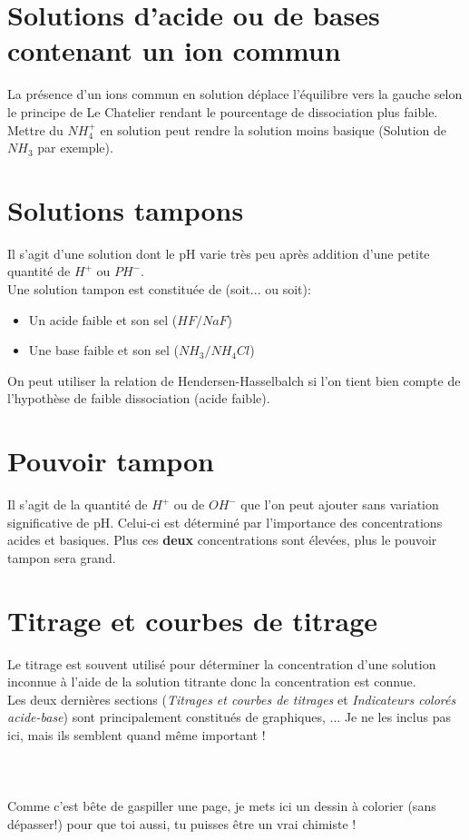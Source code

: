 \documentclass	[11pt, a4paper, openany]{book}
\begin{document}
\section{Solutions d'acide ou de bases contenant un ion commun}
La présence d'un ions commun en solution déplace l'équilibre vers la gauche selon le principe de Le Chatelier rendant le pourcentage de dissociation plus faible. \\
Mettre du $NH_4^+$ en solution peut rendre la solution moins basique (Solution de $NH_3$ par exemple).

\section{Solutions tampons}
Il s'agit d'une solution dont le pH varie très peu après addition d'une petite quantité de $H^+$ ou $PH^-$.\\
Une solution tampon est constituée de (soit... ou soit): 
\begin{itemize}
	\item Un acide faible et son sel ($HF/NaF$)
	\item Une base faible et son sel ($NH_3/NH_4Cl$)
\end{itemize}
On peut utiliser la relation de Hendersen-Hasselbalch si l'on tient bien compte de l'hypothèse de faible dissociation (acide faible).

\section{Pouvoir tampon}
Il s'agit de la quantité de $H^+$ ou de $OH^-$ que l'on peut ajouter sans variation significative de pH. Celui-ci est déterminé par l'importance des concentrations acides et basiques. Plus ces \textbf{deux} concentrations sont élevées, plus le pouvoir tampon sera grand. 

\section{Titrage et courbes de titrage}
Le titrage est souvent utilisé pour déterminer la concentration d'une solution inconnue à l'aide de la solution titrante donc la concentration est connue.\\

Les deux dernières sections (\textit{Titrages et courbes de titrages} et \textit{Indicateurs colorés acide-base}) sont principalement constitués de graphiques, ... Je ne les inclus pas ici, mais ils semblent quand même important ! \\
\\
\\
\\
Comme c'est bête de gaspiller une page, je mets ici un dessin à colorier (sans dépasser!) pour que toi aussi, tu puisses être un vrai chimiste ! 
\end{document}
